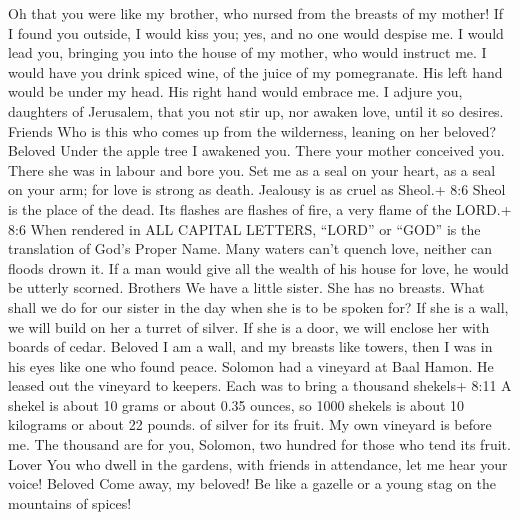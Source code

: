  Oh that you were like my brother, who nursed from the
breasts of my mother! If I found you outside, I would kiss you; yes, and
no one would despise me.  I would lead you, bringing you
into the house of my mother, who would instruct me. I would have you
drink spiced wine, of the juice of my pomegranate.  His left
hand would be under my head. His right hand would embrace me.
 I adjure you, daughters of Jerusalem, that you not stir up,
nor awaken love, until it so desires. Friends  Who is this
who comes up from the wilderness, leaning on her beloved? Beloved Under
the apple tree I awakened you. There your mother conceived you. There
she was in labour and bore you.  Set me as a seal on your
heart, as a seal on your arm; for love is strong as death. Jealousy is
as cruel as Sheol.+ 8:6 Sheol is the place of the dead. Its flashes are
flashes of fire, a very flame of the LORD.+ 8:6 When rendered in ALL
CAPITAL LETTERS, ``LORD'' or ``GOD'' is the translation of God's Proper
Name.  Many waters can't quench love, neither can floods
drown it. If a man would give all the wealth of his house for love, he
would be utterly scorned. Brothers  We have a little sister.
She has no breasts. What shall we do for our sister in the day when she
is to be spoken for?  If she is a wall, we will build on her
a turret of silver. If she is a door, we will enclose her with boards of
cedar. Beloved  I am a wall, and my breasts like towers,
then I was in his eyes like one who found peace.  Solomon
had a vineyard at Baal Hamon. He leased out the vineyard to keepers.
Each was to bring a thousand shekels+ 8:11 A shekel is about 10 grams or
about 0.35 ounces, so 1000 shekels is about 10 kilograms or about 22
pounds. of silver for its fruit.  My own vineyard is before
me. The thousand are for you, Solomon, two hundred for those who tend
its fruit. Lover  You who dwell in the gardens, with
friends in attendance, let me hear your voice! Beloved 
Come away, my beloved! Be like a gazelle or a young stag on the
mountains of spices!
